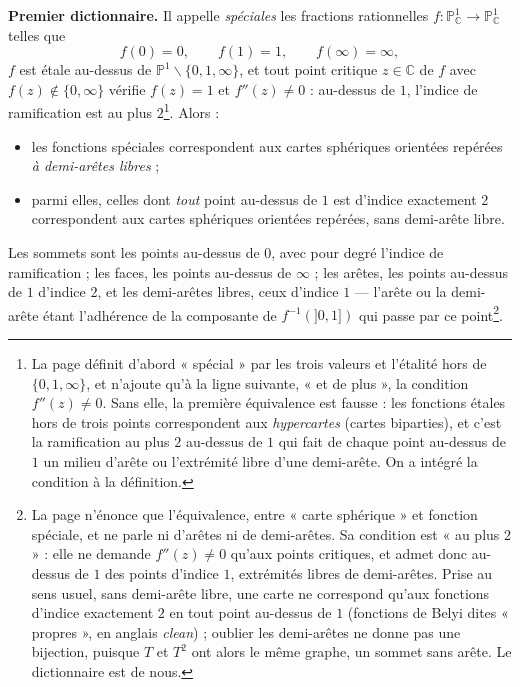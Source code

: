 \documentclass[11pt,a4paper]{article}
\begin{document}
\textbf{Premier dictionnaire.} Il appelle \emph{spéciales} les fractions
rationnelles $f \colon \mathbb{P}^1_{\mathbb{C}} \to \mathbb{P}^1_{\mathbb{C}}$
telles que
\[
f(0) = 0, \qquad f(1) = 1, \qquad f(\infty) = \infty,
\]
$f$ est étale au-dessus de $\mathbb{P}^1 \smallsetminus \{0, 1, \infty\}$, et
tout point critique $z \in \mathbb{C}$ de $f$ avec $f(z) \notin \{0,\infty\}$
vérifie $f(z) = 1$ et $f''(z) \neq 0$ : au-dessus de $1$, l'indice de
ramification est au plus $2$\footnote{La page définit d'abord « spécial »
par les trois valeurs et l'étalité hors de $\{0,1,\infty\}$, et n'ajoute
qu'à la ligne suivante, « et de plus », la condition $f''(z) \neq 0$. Sans
elle, la première équivalence est fausse : les fonctions étales hors de
trois points correspondent aux \emph{hypercartes} (cartes biparties), et
c'est la ramification au plus $2$ au-dessus de $1$ qui fait de chaque point
au-dessus de $1$ un milieu d'arête ou l'extrémité libre d'une demi-arête.
On a intégré la condition à la définition.}. Alors :
\begin{itemize}
  \item les fonctions spéciales correspondent aux cartes sphériques
  orientées repérées \emph{à demi-arêtes libres} ;
  \item parmi elles, celles dont \emph{tout} point au-dessus de $1$ est
  d'indice exactement $2$ correspondent aux cartes sphériques orientées
  repérées, sans demi-arête libre.
\end{itemize}
Les sommets sont les points au-dessus de $0$, avec pour degré l'indice de
ramification ; les faces, les points au-dessus de $\infty$ ; les arêtes, les
points au-dessus de $1$ d'indice $2$, et les demi-arêtes libres, ceux
d'indice $1$ --- l'arête ou la demi-arête étant l'adhérence de la composante
de $f^{-1}(]0,1])$ qui passe par ce point\footnote{La page n'énonce
que l'équivalence, entre « carte sphérique » et fonction spéciale, et ne
parle ni d'arêtes ni de demi-arêtes. Sa condition est « au plus $2$ » : elle
ne demande $f''(z) \neq 0$ qu'aux points critiques, et admet donc au-dessus
de $1$ des points d'indice $1$, extrémités libres de demi-arêtes. Prise au
sens usuel, sans demi-arête libre, une carte ne correspond qu'aux fonctions
d'indice exactement $2$ en tout point au-dessus de $1$ (fonctions de Belyi
dites « propres », en anglais \emph{clean}) ; oublier les demi-arêtes ne
donne pas une bijection, puisque $T$ et $T^2$ ont alors le même graphe, un
sommet sans arête. Le dictionnaire est de nous.}.
\end{document}
